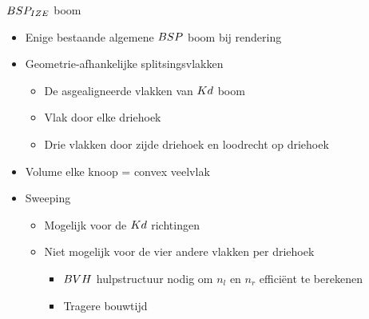 \documentclass[11pt,t]{beamer}
\begin{document}
\begin{frame}{$BSP_{IZE}$ boom}
	\begin{itemize}
	\item Enige bestaande algemene $BSP$ boom bij rendering
	\item Geometrie-afhankelijke splitsingsvlakken
		\begin{itemize}
			\item De asgealigneerde vlakken van $Kd$ boom
			\item Vlak door elke driehoek
			\item Drie vlakken door zijde driehoek en loodrecht op driehoek
		\end{itemize}
	\item Volume elke knoop = convex veelvlak
	\item Sweeping
		\begin{itemize}
			\item Mogelijk voor de $Kd$ richtingen
			\item Niet mogelijk voor de vier andere vlakken per driehoek
			\begin{itemize}
				\item $BVH$ hulpstructuur nodig om $n_l$ en $n_r$ efficiënt te berekenen
				\item Tragere bouwtijd
			\end{itemize}
		\end{itemize}
	\end{itemize}
\end{frame}
\end{document}
